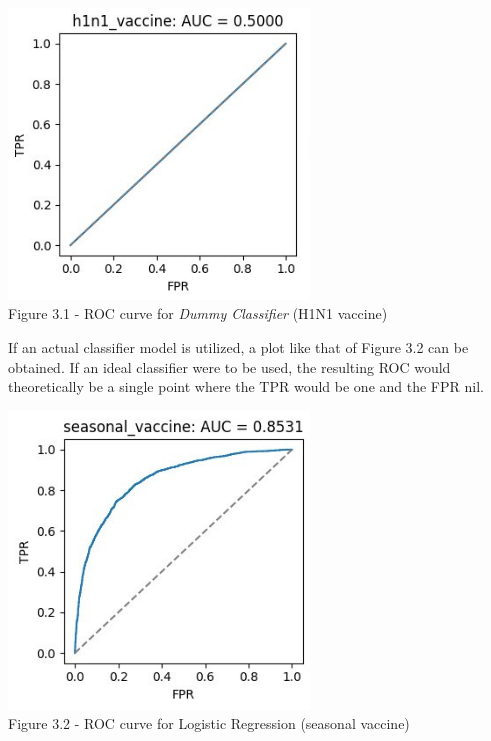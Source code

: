\documentclass{IEEEtran}
\begin{document}
\begin{center}
    \includegraphics[width=8cm]{figures/ROC_Dummy_Classifier.png}\\
    Figure 3.1 - ROC curve for \textit{Dummy Classifier} (H1N1 vaccine)
\end{center}

If an actual classifier model is utilized, a plot like that of Figure 3.2 can be obtained. If an ideal classifier were to be used, the resulting ROC would theoretically be a single point where the TPR would be one and the FPR nil.

\begin{center}
    \includegraphics[width=8cm]{figures/ROC_CatBoost.png}\\
    Figure 3.2 - ROC curve for Logistic Regression (seasonal vaccine)
\end{center}
\end{document}
